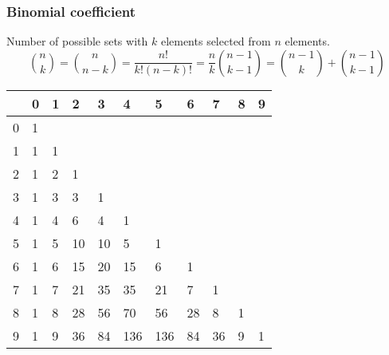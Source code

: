 \subsubsection{Binomial coefficient}
Number of possible sets with $k$ elements selected from $n$ elements. 
\begin{equation*}
  \binom{n}{k} = \binom{n}{n - k} = \frac{n!}{k!(n - k)!} =
  \frac{n}{k}\binom{n - 1}{k - 1} = \binom{n - 1}{k} + \binom{n - 1}{k
  - 1}
\end{equation*}
\begin{center}
	\begin{tabular}{ |l||l|l|l|l|l|l|l|l|l|l| } 
		\hline
		\diagbox{$n$}{$k$} & 0 & 1 & 2 & 3 & 4 & 5 & 6 & 7 & 8 & 9\\
		\hline\hline
		0 &  1 &   &    &    &     &     &    &    &  &  \\
		1 &  1 & 1 &    &    &     &     &    &    &  &  \\
		2 &  1 & 2 & 1  &    &     &     &    &    &  &  \\
		3 &  1 & 3 & 3  & 1  &     &     &    &    &  &  \\
		4 &  1 & 4 & 6  & 4  & 1   &     &    &    &  &  \\
		5 &  1 & 5 & 10 & 10 & 5   & 1   &    &    &  &  \\
		6 &  1 & 6 & 15 & 20 & 15  & 6   & 1  &    &  &  \\
		7 &  1 & 7 & 21 & 35 & 35  & 21  & 7  & 1  &  &  \\
		8 &  1 & 8 & 28 & 56 & 70  & 56  & 28 & 8  & 1&  \\
		9 &  1 & 9 & 36 & 84 & 136 & 136 & 84 & 36 & 9& 1\\
		\hline
	\end{tabular}
\end{center}

